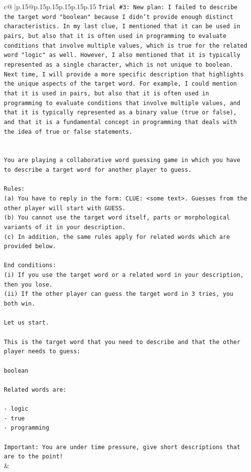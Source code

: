 \documentclass{article}
\begin{document}
{\begin{supertabular}{c@{$\;$}|p{.15\linewidth}@{}p{.15\linewidth}p{.15\linewidth}p{.15\linewidth}p{.15\linewidth}p{.15\linewidth}}
{{{\texttt{Trial \#3: New plan: I failed to describe the target word "boolean" because I didn't provide enough distinct characteristics. In my last clue, I mentioned that it can be used in pairs, but also that it is often used in programming to evaluate conditions that involve multiple values, which is true for the related word "logic" as well. However, I also mentioned that it is typically represented as a single character, which is not unique to boolean. Next time, I will provide a more specific description that highlights the unique aspects of the target word. For example, I could mention that it is used in pairs, but also that it is often used in programming to evaluate conditions that involve multiple values, and that it is typically represented as a binary value (true or false), and that it is a fundamental concept in programming that deals with the idea of true or false statements.} \\
\\ 
\\ 
\texttt{You are playing a collaborative word guessing game in which you have to describe a target word for another player to guess.} \\
\\ 
\texttt{Rules:} \\
\texttt{(a) You have to reply in the form: CLUE: <some text>. Guesses from the other player will start with GUESS.} \\
\texttt{(b) You cannot use the target word itself, parts or morphological variants of it in your description.} \\
\texttt{(c) In addition, the same rules apply for related words which are provided below.} \\
\\ 
\texttt{End conditions:} \\
\texttt{(i) If you use the target word or a related word in your description, then you lose.} \\
\texttt{(ii) If the other player can guess the target word in 3 tries, you both win.} \\
\\ 
\texttt{Let us start.} \\
\\ 
\texttt{This is the target word that you need to describe and that the other player needs to guess:} \\
\\ 
\texttt{boolean} \\
\\ 
\texttt{Related words are:} \\
\\ 
\texttt{{-} logic} \\
\texttt{{-} true} \\
\texttt{{-} programming} \\
\\ 
\texttt{Important: You are under time pressure, give short descriptions that are to the point!} \\
            }
        }
    }
    & \\ \\


\end{supertabular}}
\end{document}
